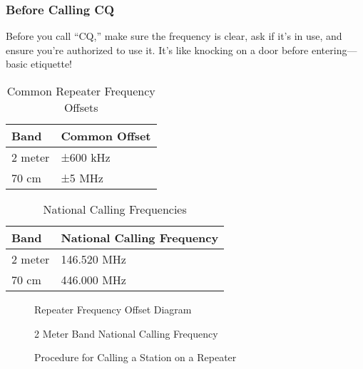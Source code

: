 \subsubsection*{Before Calling CQ}
Before you call “CQ,” make sure the frequency is clear, ask if it’s in use, and ensure you’re authorized to use it. It’s like knocking on a door before entering—basic etiquette!

\begin{table}[h]
\centering
\caption{Common Repeater Frequency Offsets}
\label{tab:repeater-offsets}
\begin{tabular}{|l|l|}
\hline
\textbf{Band} & \textbf{Common Offset} \\ \hline
2 meter       & ±600 kHz               \\ \hline
70 cm         & ±5 MHz                 \\ \hline
\end{tabular}
\end{table}

\begin{table}[h]
\centering
\caption{National Calling Frequencies}
\label{tab:national-calling-frequencies}
\begin{tabular}{|l|l|}
\hline
\textbf{Band} & \textbf{National Calling Frequency} \\ \hline
2 meter       & 146.520 MHz                        \\ \hline
70 cm         & 446.000 MHz                        \\ \hline
\end{tabular}
\end{table}

\begin{figure}[h]
\centering
\caption{Repeater Frequency Offset Diagram}
\label{fig:repeater-offset}
\end{figure}

\begin{figure}[h]
\centering
\caption{2 Meter Band National Calling Frequency}
\label{fig:2m-calling-frequency}
\end{figure}

\begin{figure}[h]
\centering
\caption{Procedure for Calling a Station on a Repeater}
\label{fig:repeater-calling-procedure}
\end{figure}

